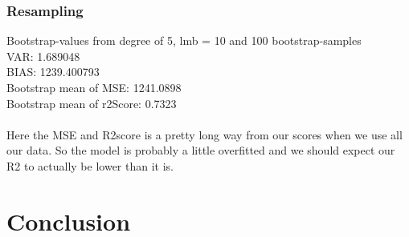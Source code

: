 \documentclass[a4paper,norsk]{article}
\begin{document}
\subsubsection{Resampling}
Bootstrap-values from degree of 5, lmb = 10 and 100 bootstrap-samples
\\VAR: 1.689048
\\BIAS: 1239.400793
\\Bootstrap mean of MSE: 1241.0898
\\Bootstrap mean of r2Score: 0.7323
\\
\\Here the MSE and R2score is a pretty long way from our scores when we use all our data. So the model is probably a little overfitted and we should expect our R2 to actually be lower than it is.
\clearpage
\section{Conclusion}
\end{document}
